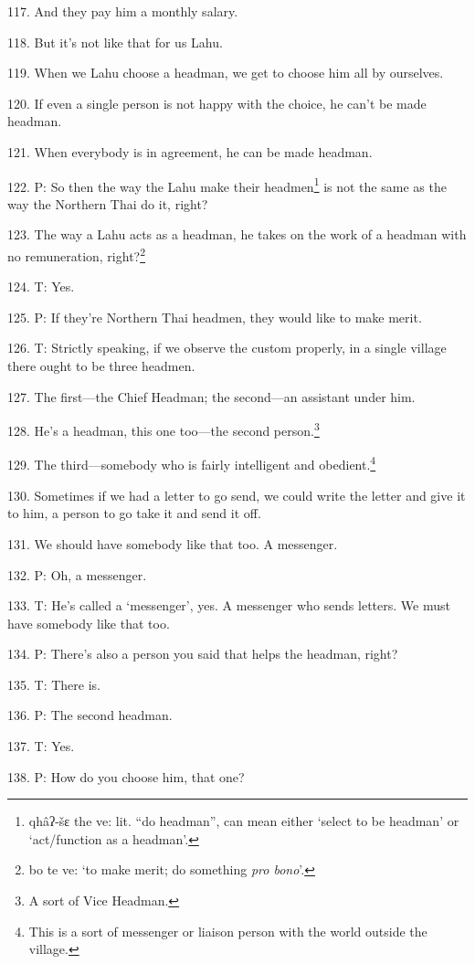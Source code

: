 117. And they pay him a monthly salary.

118. But it's not like that for us Lahu.

119. When we Lahu choose a headman, we get to choose him all by ourselves.

120. If even a single person is not happy with the choice, he can't be made headman.

121. When everybody is in agreement, he can be made headman.

122. P: So then the way the Lahu make their headmen\footnote{qhâʔ-šɛ the ve: lit. ``do headman'', can mean either `select to be headman' or `act/function as a headman'.} is not the same as the
way the Northern Thai do it, right?

123. The way a Lahu acts as a headman, he takes on the work of a headman with no
remuneration, right?\footnote{bo te ve: `to make merit; do something \textit{pro bono}'.}

124. T: Yes.

125. P: If they're Northern Thai headmen, they would like to make merit.

126. T: Strictly speaking, if we observe the custom properly, in a single village
there ought to be three headmen.

127. The first---the Chief Headman; the second---an assistant under him.

128. He's a headman, this one too---the second person.\footnote{A sort of Vice Headman.}

129. The third---somebody who is fairly intelligent and obedient.\footnote{This is a sort of messenger or liaison person with the world outside the village.}

130. Sometimes if we had a letter to go send, we could write the letter and give
it to him, a person to go take it and send it off.

131. We should have somebody like that too. A messenger.

132. P: Oh, a messenger.

133. T: He's called a `messenger', yes. A messenger who sends letters. We must
have somebody like that too.

134. P: There's also a person you said that helps the headman, right?

135. T: There is.

136. P: The second headman.

137. T: Yes.

138. P: How do you choose him, that one?

